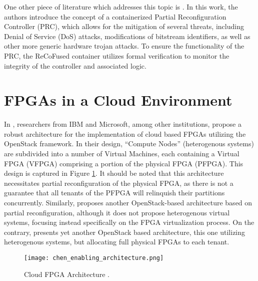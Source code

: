 One other piece of literature which addresses this topic is \cite{ustaoglu_recofused_2020}. In this work, the authors introduce the concept of a containerized Partial Reconfiguration Controller (PRC), which allows for the mitigation of several threats, including Denial of Service (DoS) attacks, modifications of bitstream identifiers, as well as other more generic hardware trojan attacks. To ensure the functionality of the PRC, the ReCoFused container utilizes formal verification to monitor the integrity of the controller and associated logic.

\section{FPGAs in a Cloud Environment}\label{sec:fpgaCloud}
In \cite{chen_enabling_2014}, researchers from IBM and Microsoft, among other institutions, propose a robust architecture for the implementation of cloud based FPGAs utilizing the OpenStack framework. In their design, ``Compute Nodes'' (heterogenous systems) are subdivided into a number of Virtual Machines, each containing a Virtual FPGA (VFPGA) comprising a portion of the physical FPGA (PFPGA). This design is captured in Figure \ref{fig:chen_enabling_architecture}. It should be noted that this architecture necessitates partial reconfiguration of the physical FPGA, as there is not a guarantee that all tenants of the PFPGA will relinquish their partitions concurrently. Similarly, \cite{byma_fpgas_2014} proposes another OpenStack-based architecture based on partial reconfiguration, although it does not propose heterogenous virtual systems, focusing instead specifically on the FPGA virtualization process. On the contrary, \cite{tarafdar_designing_2018} presents yet another OpenStack based architecture, this one utilizing heterogenous systems, but allocating full physical FPGAs to each tenant.

\begin{figure}
    \centering
    \texttt{[image: chen\_enabling\_architecture.png]}
    \caption[Cloud FPGA Architecture]{Cloud FPGA Architecture \cite{chen_enabling_2014}.}
    \label{fig:chen_enabling_architecture}
\end{figure}



